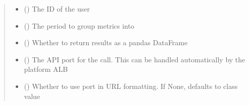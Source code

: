 \documentclass[letterpaper,10pt,english]{sphinxmanual}
\begin{document}
\begin{fulllineitems}
\begin{fulllineitems}
\begin{sphinxVerbatim}[commandchars=\\\{\}]
 
  
\end{sphinxVerbatim}
\begin{quote}\begin{description}
\begin{itemize}
\item {} 
\sphinxAtStartPar
{} () \textendash{} The ID of the user

\item {} 
\sphinxAtStartPar
{} (\sphinxstyleliteralemphasis{\sphinxupquote{ (}}\sphinxstyleliteralemphasis{\sphinxupquote{)}}) \textendash{} The period to group metrics into

\item {} 
\sphinxAtStartPar
{} (\sphinxstyleliteralemphasis{\sphinxupquote{ (}}\sphinxstyleliteralemphasis{\sphinxupquote{)}}) \textendash{} Whether to return results as a pandas DataFrame

\item {} 
\sphinxAtStartPar
{} (\sphinxstyleliteralemphasis{\sphinxupquote{ (}}\sphinxstyleliteralemphasis{\sphinxupquote{)}}) \textendash{} The API port for the call. This can be handled automatically by the platform ALB

\item {} 
\sphinxAtStartPar
{} (\sphinxstyleliteralemphasis{\sphinxupquote{ (}}\sphinxstyleliteralemphasis{\sphinxupquote{)}}) \textendash{} Whether to use port in URL formatting. If None, defaults to class value


\end{itemize}
\end{description}
\end{quote}
\end{fulllineitems}
\end{fulllineitems}
\end{document}
